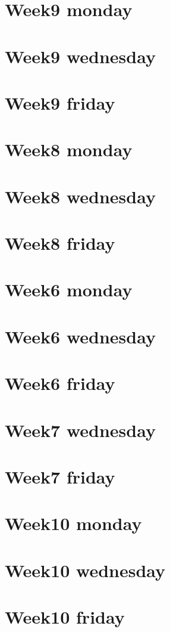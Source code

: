 
\section*{Week9 monday}

\vfill
\section*{Week9 wednesday}

\vfill
\section*{Week9 friday}

\vfill
\section*{Week8 monday}

\vfill
\section*{Week8 wednesday}

\vfill
\section*{Week8 friday}

\vfill
\section*{Week6 monday}

\vfill
\section*{Week6 wednesday}

\vfill
\section*{Week6 friday}

\vfill
\section*{Week7 wednesday}

\vfill
\section*{Week7 friday}

\vfill
\section*{Week10 monday}

\vfill
\section*{Week10 wednesday}

\vfill
\section*{Week10 friday}

\vfill
